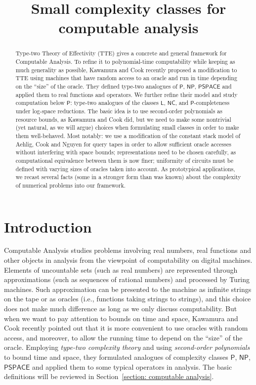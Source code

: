 \documentclass[conference]{IEEEtran}
\title{Small complexity classes for computable analysis}
\author{\IEEEauthorblockN{Akitoshi Kawamura}
\IEEEauthorblockA{Department of Computer Science\\
University of Tokyo}
\and
\IEEEauthorblockN{Hiroyuki Ota}
\IEEEauthorblockA{Department of Computer Science\\
University of Tokyo}
}
\newcommand{\classonefont}[1]{\mathsf{#1}}
\newcommand{\classL}{\classonefont{L}}
\newcommand{\classP}{\classonefont{P}}
\newcommand{\classPSPACE}{\classonefont{PSPACE}}
\newcommand{\classNP}{\classonefont{NP}}
\newcommand{\classNC}{\classonefont{NC}}
\theoremstyle{definition}
\theoremstyle{remark}
\begin{document}
\maketitle

\begin{abstract}
Type-two Theory of Effectivity (TTE) gives a concrete and general framework for 
Computable Analysis. 
To refine it to polynomial-time computability 
while keeping as much generality as possible, 
Kawamura and Cook recently proposed a modification to TTE using 
machines that have random access to an oracle and 
run in time depending on the ``size'' of the oracle. 
They defined type-two analogues of 
$\classP$, $\classNP$, $\classPSPACE$ 
and applied them to real functions and operators. 
We further refine their model and study computation below $\classP$: 
type-two analogues of 
the classes $\classL$, 
$\classNC$, 
and $\classP$-completeness under log-space reductions.
The basic idea is 
to use second-order polynomials as resource bounds, 
as Kawamura and Cook did, 
but we need to make some nontrivial (yet natural, as we will argue) choices
when formulating small classes
in order to make them well-behaved. 
Most notably: 
we use a modification of the constant stack model 
of Aehlig, Cook and Nguyen for query tapes 
in order to allow sufficient oracle accesses without interfering with space bounds; 
representations need to be chosen carefully, as 
computational equivalence between them is now finer; 
uniformity of circuits must be defined 
with varying sizes of oracles taken into account. 
As prototypical applications, 
we recast several facts (some in a stronger form than was known) 
about the complexity of numerical problems 
into our framework. 
\end{abstract}

\section{Introduction}
\label{section: introduction}

Computable Analysis 
\cite{bhw,ko1991complexity,weihrauch00:_comput_analy}
studies problems 
involving real numbers, real functions and other objects in analysis
from the viewpoint of computability on digital machines. 
Elements of uncountable sets (such as real numbers) are
represented through approximations (such as sequences of rational numbers)
and processed by Turing machines. 
Such approximation can be 
presented to the machine 
as infinite strings on the tape 
or as oracles (i.e., functions taking strings to strings), 
and this choice does not make much difference 
as long as we only discuss computability. 
But when we want to pay attention to bounds on time and space, 
Kawamura and Cook \cite{kawamura2012complexity} recently pointed out that 
it is more convenient to use oracles with random access, 
and moreover, to allow the running time 
to depend on the ``size'' of the oracle. 
Employing \emph{type-two complexity theory} and 
using \emph{second-order polynomials} to bound time and space, 
they formulated analogues of complexity classes 
$\classP$, $\classNP$, $\classPSPACE$ and 
applied them to some typical operators in analysis. 
The basic definitions will be reviewed in Section~\ref{section: computable analysis}. 
\end{document}
